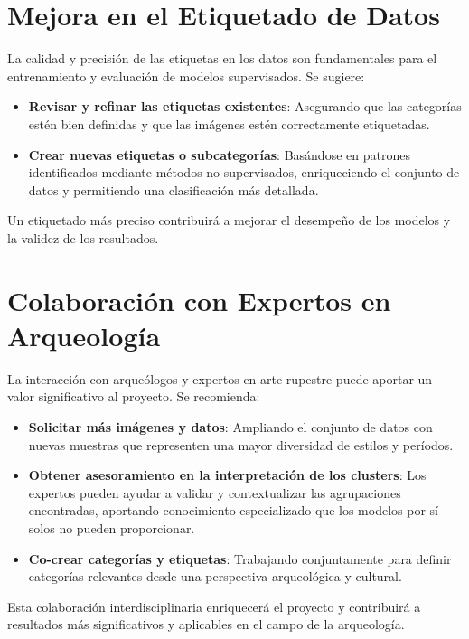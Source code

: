 \section{Mejora en el Etiquetado de Datos}

La calidad y precisión de las etiquetas en los datos son fundamentales para el entrenamiento y evaluación de modelos supervisados. Se sugiere:

\begin{itemize}
    \item \textbf{Revisar y refinar las etiquetas existentes}: Asegurando que las categorías estén bien definidas y que las imágenes estén correctamente etiquetadas.
    \item \textbf{Crear nuevas etiquetas o subcategorías}: Basándose en patrones identificados mediante métodos no supervisados, enriqueciendo el conjunto de datos y permitiendo una clasificación más detallada.
\end{itemize}

Un etiquetado más preciso contribuirá a mejorar el desempeño de los modelos y la validez de los resultados.

\section{Colaboración con Expertos en Arqueología}

La interacción con arqueólogos y expertos en arte rupestre puede aportar un valor significativo al proyecto. Se recomienda:

\begin{itemize}
    \item \textbf{Solicitar más imágenes y datos}: Ampliando el conjunto de datos con nuevas muestras que representen una mayor diversidad de estilos y períodos.
    \item \textbf{Obtener asesoramiento en la interpretación de los clusters}: Los expertos pueden ayudar a validar y contextualizar las agrupaciones encontradas, aportando conocimiento especializado que los modelos por sí solos no pueden proporcionar.
    \item \textbf{Co-crear categorías y etiquetas}: Trabajando conjuntamente para definir categorías relevantes desde una perspectiva arqueológica y cultural.
\end{itemize}

Esta colaboración interdisciplinaria enriquecerá el proyecto y contribuirá a resultados más significativos y aplicables en el campo de la arqueología.

